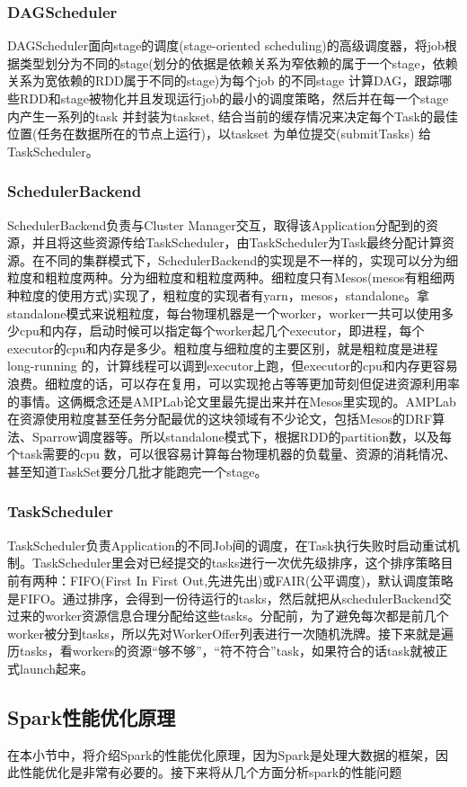 \subsubsection{DAGScheduler}
DAGScheduler面向stage的调度(stage-oriented scheduling)的高级调度器，将job根据类型划分为不同的stage(划分的依据是依赖关系为窄依赖的属于一个stage，依赖关系为宽依赖的RDD属于不同的stage)为每个job 的不同stage 计算DAG，跟踪哪些RDD和stage被物化并且发现运行job的最小的调度策略，然后并在每一个stage 内产生一系列的task 并封装为taskset, 结合当前的缓存情况来决定每个Task的最佳位置(任务在数据所在的节点上运行)，以taskset 为单位提交(submitTasks) 给TaskScheduler。
\subsubsection{SchedulerBackend}
SchedulerBackend负责与Cluster Manager交互，取得该Application分配到的资源，并且将这些资源传给TaskScheduler，由TaskScheduler为Task最终分配计算资源。在不同的集群模式下，SchedulerBackend的实现是不一样的，实现可以分为细粒度和粗粒度两种。分为细粒度和粗粒度两种。细粒度只有Mesos(mesos有粗细两种粒度的使用方式)实现了，粗粒度的实现者有yarn，mesos，standalone。拿standalone模式来说粗粒度，每台物理机器是一个worker，worker一共可以使用多少cpu和内存，启动时候可以指定每个worker起几个executor，即进程，每个executor的cpu和内存是多少。粗粒度与细粒度的主要区别，就是粗粒度是进程long-running 的，计算线程可以调到executor上跑，但executor的cpu和内存更容易浪费。细粒度的话，可以存在复用，可以实现抢占等等更加苛刻但促进资源利用率的事情。这俩概念还是AMPLab论文里最先提出来并在Mesos里实现的。AMPLab在资源使用粒度甚至任务分配最优的这块领域有不少论文，包括Mesos的DRF算法、Sparrow调度器等。所以standalone模式下，根据RDD的partition数，以及每个task需要的cpu 数，可以很容易计算每台物理机器的负载量、资源的消耗情况、甚至知道TaskSet要分几批才能跑完一个stage。
\subsubsection{TaskScheduler}
TaskScheduler负责Application的不同Job间的调度，在Task执行失败时启动重试机制。TaskScheduler里会对已经提交的tasks进行一次优先级排序，这个排序策略目前有两种：FIFO(First In First Out,先进先出)或FAIR(公平调度)，默认调度策略是FIFO。通过排序，会得到一份待运行的tasks，然后就把从schedulerBackend交过来的worker资源信息合理分配给这些tasks。分配前，为了避免每次都是前几个worker被分到tasks，所以先对WorkerOffer列表进行一次随机洗牌。接下来就是遍历tasks，看workers的资源“够不够”，“符不符合”task，如果符合的话task就被正式launch起来。
\subsection{Spark性能优化原理}
在本小节中，将介绍Spark的性能优化原理，因为Spark是处理大数据的框架，因此性能优化是非常有必要的。接下来将从几个方面分析spark的性能问题
